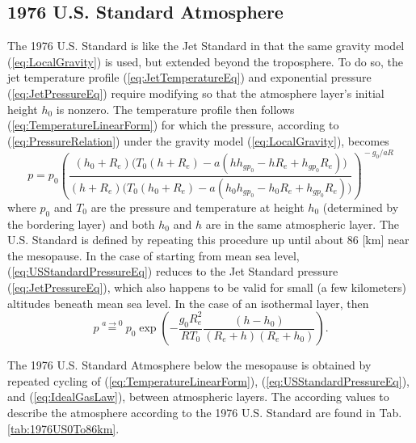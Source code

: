 \documentclass[11pt,dvipsnames]{thesis}
\begin{document}
\subsection{1976 U.S. Standard Atmosphere}
The 1976 U.S. Standard is like the Jet Standard in that the same gravity model (\ref{eq:LocalGravity}) is used, but extended beyond the troposphere. To do so, the jet temperature profile (\ref{eq:JetTemperatureEq}) and exponential pressure (\ref{eq:JetPressureEq}) require modifying so that the atmosphere layer's initial height $h_0$ is nonzero. The temperature profile then follows (\ref{eq:TemperatureLinearForm}) for which the pressure, according to (\ref{eq:PressureRelation}) under the gravity model (\ref{eq:LocalGravity}), becomes
\begin{equation}
p = p_0 \left(\!\frac{(h_0 + R_e) \big(T_0 (h + R_e) - a (h h_{gp_0} - h R_e + h_{gp_0} R_e)\big)}{(h + R_e) \big(T_0(h_0 + R_e) - a (h_0 h_{gp_0} - h_0 R_e + h_{gp_0} R_e)\big)}\!\right)^{\!-g_0 / a R} \label{eq:USStandardPressureEq}
\end{equation}
where $p_0$ and $T_0$ are the pressure and temperature at height $h_0$ (determined by the bordering layer) and both $h_0$ and $h$ are in the same atmospheric layer.
The U.S. Standard is defined by repeating this procedure up until about $86$ [\si{\km}] near the mesopause. In the case of starting from mean sea level, (\ref{eq:USStandardPressureEq}) reduces to the Jet Standard pressure (\ref{eq:JetPressureEq}), which also happens to be valid for small (a few kilometers) altitudes beneath mean sea level. In the case of an isothermal layer, then
\begin{equation}
p \overset{a \to 0}{=} p_0 \exp\!\left(-\frac{g_0 R_e^2}{R T_0} \frac{(h - h_0)}{(R_e + h) (R_e + h_0)}\right).
\end{equation}

The 1976 U.S. Standard Atmosphere below the mesopause is obtained by repeated cycling of (\ref{eq:TemperatureLinearForm}), (\ref{eq:USStandardPressureEq}), and (\ref{eq:IdealGasLaw}), between atmospheric layers. The according values to describe the atmosphere according to the 1976 U.S. Standard are found in Tab. \ref{tab:1976US0To86km}.
\end{document}
